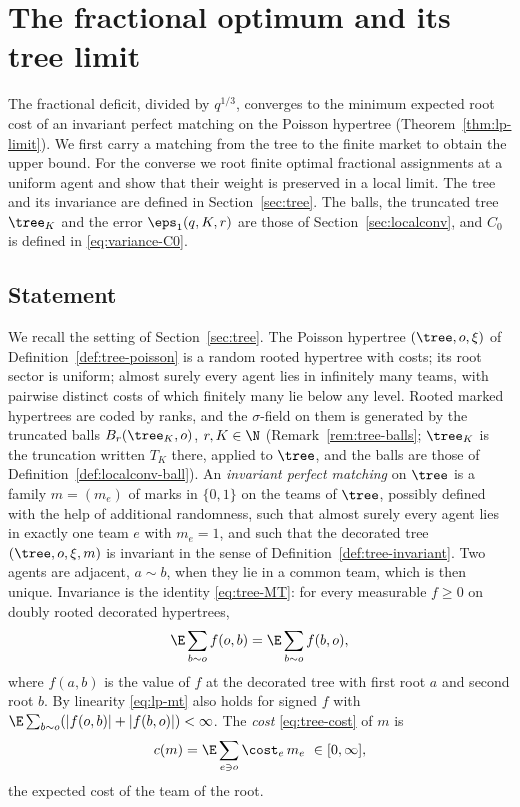 \section{The fractional optimum and its tree limit}\label{sec:lp}

The fractional deficit, divided by $q^{1/3}$, converges to the minimum expected root cost
of an invariant perfect matching on the Poisson hypertree (Theorem~\ref{thm:lp-limit}).
We first carry a matching from the tree to the finite market to obtain the upper bound.
For the converse we root finite optimal fractional assignments at a uniform agent and show
that their weight is preserved in a local limit. The tree and its invariance are defined
in Section~\ref{sec:tree}. The balls, the truncated tree $\tree_K$ and the error
$\eps_1(q,K,r)$ are those of Section~\ref{sec:localconv}, and $C_0$ is defined in
\eqref{eq:variance-C0}.

\subsection{Statement}\label{sec:lp-statement}

We recall the setting of Section~\ref{sec:tree}. The Poisson hypertree $(\tree,o,\xi)$ of
Definition~\ref{def:tree-poisson} is a random rooted hypertree with costs; its root sector
is uniform; almost surely every agent lies in infinitely many teams, with pairwise distinct
costs of which finitely many lie below any level. Rooted marked hypertrees are coded by
ranks, and the $\sigma$-field on them is generated by the truncated balls $B_r(\tree_K,o)$,
$r,K\in\N$ (Remark~\ref{rem:tree-balls}; $\tree_K$ is the truncation written $T_K$ there,
applied to $\tree$, and the balls are those of Definition~\ref{def:localconv-ball}). An
\emph{invariant perfect matching} on $\tree$ is a family $m=(m_e)$ of marks in $\{0,1\}$ on
the teams of $\tree$, possibly defined with the help of additional randomness, such that
almost surely every agent lies in exactly one team $e$ with $m_e=1$, and such that the
decorated tree $(\tree,o,\xi,m)$ is invariant in the sense of
Definition~\ref{def:tree-invariant}. Two agents are adjacent, $a\sim b$, when they lie in a
common team, which is then unique. Invariance is the identity \eqref{eq:tree-MT}: for every
measurable $f\ge0$ on doubly rooted decorated hypertrees,
\begin{equation}\label{eq:lp-mt}
\E\sum_{b\sim o}f(o,b)=\E\sum_{b\sim o}f(b,o),
\end{equation}
where $f(a,b)$ is the value of $f$ at the decorated tree with first root $a$ and second
root $b$. By linearity \eqref{eq:lp-mt} also holds for signed $f$ with
$\E\sum_{b\sim o}(|f(o,b)|+|f(b,o)|)<\infty$. The \emph{cost} \eqref{eq:tree-cost} of $m$ is
\[
c(m)=\E\sum_{e\ni o}\cost_e\,m_e\ \in[0,\infty],
\]
the expected cost of the team of the root.

